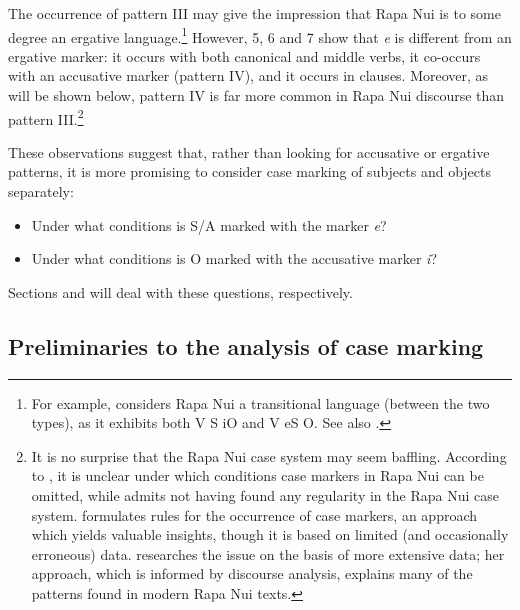 The occurrence of pattern III may give the impression that Rapa Nui is to some degree an ergative language.\footnote{\label{fn:386}For example, \citet[296]{Otsuka2011} considers Rapa Nui a transitional language (between the two types), as it exhibits both V S iO and V eS O. See also \citet[182]{Mosel1997}.} However, 5, 6 and 7 show that \textit{e} is different from an ergative marker: it occurs with both canonical and middle verbs, it co\nobreakdash-occurs with an accusative marker (pattern IV), and it occurs in  clauses. Moreover, as will be shown below, pattern IV is far more common in Rapa Nui discourse than pattern III.\footnote{\label{fn:387}It is no surprise that the Rapa Nui case system may seem baffling. According to \citet[575]{Clark1973}, it is unclear under which conditions case markers in Rapa Nui can be omitted, while \citet[168]{Chapin1978} admits not having found any regularity in the Rapa Nui case system. \citet{Alexander1981OL,Alexander1981Minnesota} formulates rules for the occurrence of case markers, an approach which yields valuable insights, though it is based on limited (and occasionally erroneous) data. \citet{WeberN1988,WeberN2003} researches the issue on the basis of more extensive data; her approach, which is informed by discourse analysis, explains many of the patterns found in modern Rapa Nui texts.}

These observations suggest that, rather than looking for accusative or ergative patterns, it is more promising to consider case marking of subjects and objects separately: 

\begin{itemize}
\item 
Under what conditions is S/A marked with the  marker \textit{e}?

\item 
Under what conditions is O marked with the accusative marker \textit{i}? 

\end{itemize}

Sections  and  will deal with these questions, respectively. 

\subsection{Preliminaries to the analysis of case marking} \label{sec:8.2.3}

